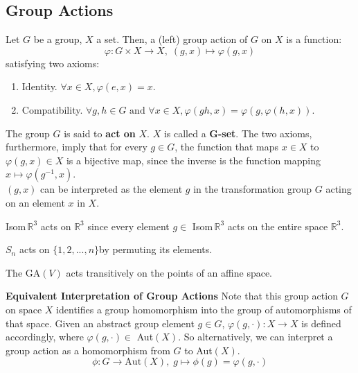 \documentclass{article}
\begin{document}
  \subsection{Group Actions}

    \begin{definition}
      Let $G$ be a group, $X$ a set. Then, a (left) group action of $G$ on $X$ is a function: 
      \begin{equation}
        \varphi: G \times X \longrightarrow X, \; (g,x) \longmapsto \varphi(g,x)
      \end{equation}
      satisfying two axioms:
      \begin{enumerate}
        \item Identity. $\forall x \in X, \varphi(e, x) = x$. 
        \item Compatibility. $\forall g, h \in G \text{ and } \forall x \in X, \varphi(gh, x) = \varphi(g, \varphi(h, x))$.
      \end{enumerate}
      The group $G$ is said to \textbf{act on} $X$. $X$ is called a \textbf{G-set}. The two axioms, furthermore, imply that for every $g \in G$, the function that maps $x \in X$ to $ \varphi(g, x) \in X$ is a bijective map, since the inverse is the function mapping $x \mapsto \varphi(g^{-1}, x)$. \\
      $(g, x)$ can be interpreted as the element $g$ in the transformation group $G$ acting on an element $x$ in $X$.
    \end{definition}

    \begin{example}
      Isom$\,\mathbb{R}^{3}$ acts on $\mathbb{R}^{3}$ since every element $g \in$ Isom$\,\mathbb{R}^{3}$ acts on the entire space $\mathbb{R}^{3}$. 
    \end{example}

    \begin{example}
      $S_n$ acts on $\{1, 2, ..., n\}$by permuting its elements.
    \end{example}

    \begin{example}
      The GA$(V)$ acts transitively on the points of an affine space.
    \end{example}

    \textbf{Equivalent Interpretation of Group Actions}
    Note that this group action $G$ on space $X$ identifies a group homomorphism into the group of automorphisms of that space. Given an abstract group element $g \in G$, $\varphi(g, \cdot): X \longrightarrow X$ is defined accordingly, where $\varphi(g, \cdot) \in $ Aut$(X)$. So alternatively, we can interpret a group action as a homomorphism from $G$ to Aut$(X)$. 
    \begin{equation}
      \phi: G \longrightarrow \text{Aut}(X), \; g \mapsto \phi(g) = \varphi(g,\cdot)
    \end{equation}
\end{document}
